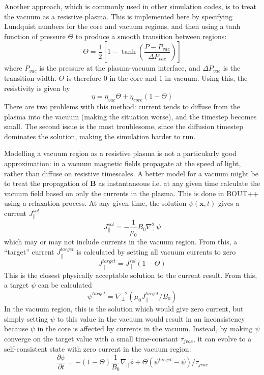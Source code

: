 \documentclass[12pt, a4paper]{article}
\newcommand{\deriv}[2]{\ensuremath{\frac{\partial #1}{\partial #2}}}
\newcommand{\Vec}[1]{\ensuremath{\mathbf{#1}}}
\newcommand{\Bvec}{\Vec{B}}
\newcommand{\Jpar}{J_{||}}
\newcommand{\delp}{\nabla_\perp^2}
\begin{document}
Another approach, which is commonly used in other simulation codes, is to treat the
vacuum as a resistive plasma. This is implemented here by specifying Lundquist numbers
for the core and vacuum regions, and then using a tanh function of pressure $\Theta$ to
produce a smooth transition between regions: 
\begin{equation}
\Theta = \frac{1}{2}\left[1-\tanh\left(\frac{P - P_{vac}}{\Delta P_{vac}}\right)\right]
\label{eq:vacmask}
\end{equation}
where $P_{vac}$ is the pressure at the plasma-vacuum interface, and $\Delta P_{vac}$
is the transition width. $\Theta$ is therefore $0$ in the core and $1$ in vacuum. Using this, the
resistivity is given by
\begin{equation}
\eta = \eta_{vac}\Theta + \eta_{core}\left(1-\Theta\right)
\end{equation}
There are two problems with this method: current tends
to diffuse from the plasma into the vacuum (making the situation worse), and the timestep
becomes small. The second issue is the most troublesome, since the diffusion timestep
dominates the solution, making the simulation harder to run.

Modelling a vacuum region as a resistive plasma is not a particularly good approximation: in a vacuum
magnetic fields propagate at the speed of light, rather than diffuse on resistive timescales. 
A better model for a vacuum might be to treat the propagation of $\Bvec$ as instantaneous i.e.
at any given time calculate the vacuum field based on only the currents in the plasma.
This is done in BOUT++ using a relaxation process. At any given time, the solution
$\psi\left(\mathbf{x},t\right)$ gives a current $\Jpar^{sol}$
\[
\Jpar^{sol} = -\frac{1}{\mu_0}B_0\delp\psi
\]
which may or may not include currents in the vacuum region. From this, a ``target''
current $\Jpar^{target}$ is calculated by setting all vacuum currents to zero
\[
\Jpar^{target} = \Jpar^{sol} \left(1 - \Theta\right)
\]
This is the closest physically acceptable solution to the current result. From this, 
a target $\psi$ can be calculated
\[
\psi^{target} = \nabla_\perp^{-2}\left(\mu_0 \Jpar^{target} / B_0\right)
\]
In the vacuum region, this is the solution which would give zero current, but simply
setting $\psi$ to this value in the vacuum would result in an inconsistency because $\psi$ in the
core is affected by currents in the vacuum. Instead, by making
$\psi$ converge on the target value with a small time-constant $\tau_{jvac}$, it can evolve to a
self-consistent state with zero current in the vacuum region:
\[
\deriv{\psi}{t} = -\left(1-\Theta\right)\frac{1}{B_0}\nabla_{||}\phi +  \Theta\left(\psi^{target} - \psi\right) / \tau_{jvac}
\]
\end{document}
